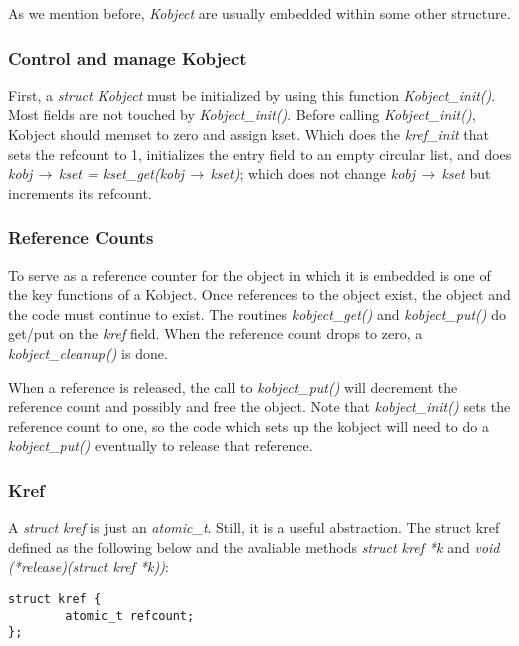 \documentclass[10pt,draftclsnofoot,journal,compsoc,onecolumn]{IEEEtran}
\begin{document}
As we mention before, \textit{Kobject} are usually embedded within some other structure.

\subsubsection{Control and manage Kobject}
\par First, a \textit{struct Kobject} must be initialized by using this function \textit{Kobject\_init()}. Most fields are not touched by \textit{Kobject\_init()}. Before calling \textit{Kobject\_init()}, Kobject should memset to zero and assign kset. Which does the \textit{kref\_init} that sets the refcount to 1, initializes the entry field to an empty circular list, and does \textit{kobj$\,\to\,$kset = kset\_get(kobj$\,\to\,$kset)};
which does not change \textit{kobj$\,\to\,$kset} but increments its refcount.\\


\subsubsection{Reference Counts}
To serve as a reference counter for the object in which it is embedded is one of the key functions of a Kobject. Once references to the object exist, the object and the code must continue to exist. The routines \textit{kobject\_get()} and \textit{kobject\_put()} do get/put on the \textit{kref} field. When the reference count drops to zero, a \textit{kobject\_cleanup()} is done.

When a reference is released, the call to \textit{kobject\_put()} will decrement the
reference count and possibly and free the object. Note that \textit{kobject\_init()}
sets the reference count to one, so the code which sets up the kobject will
need to do a \textit{kobject\_put()} eventually to release that reference.



\subsubsection{Kref}
A \textit{struct kref} is just an \textit{atomic\_t}. Still, it is a useful abstraction.
The struct kref defined as the following below and the avaliable methods \textit{struct kref *k} and \textit{ void (*release)(struct kref *k))}:

\begin{lstlisting}
struct kref {
        atomic_t refcount;
};
\end{lstlisting}
\end{document}
